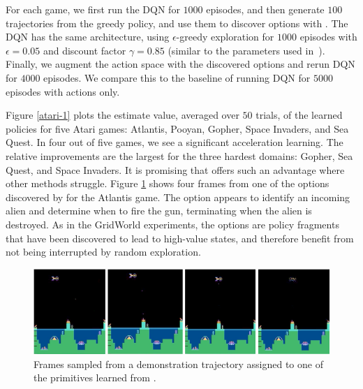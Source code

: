 For each game, we first run the DQN for $1000$ episodes, and then generate $100$ trajectories from the greedy policy, and use them to discover options with \alg.
The DQN has the same architecture, using $\epsilon$-greedy exploration for $1000$ episodes with $\epsilon=0.05$ and discount factor $\gamma=0.85$ (similar to the parameters used in~\citep{sygnowski2016learning}). 
Finally, we augment the action space with the discovered options and rerun DQN for $4000$ episodes. 
We compare this to the baseline of running DQN for $5000$ episodes with actions only.

Figure \ref{atari-1} plots the estimate value, averaged over $50$ trials, of the learned policies for five Atari games: Atlantis, Pooyan, Gopher, Space Invaders, and Sea Quest.
In four out of five games, we see a significant acceleration learning.
The relative improvements are the largest for the three hardest domains: Gopher, Sea Quest, and Space Invaders.
It is promising that \alg offers such an advantage where other methods struggle. 
Figure \ref{atari-3} shows four frames from one of the options discovered by \alg for the Atlantis game. %
The option appears to identify an incoming alien and determine when to fire the gun, terminating when the alien is destroyed.
As in the GridWorld experiments, the options are policy fragments that have been discovered to lead to high-value states, and therefore benefit from not being interrupted by random exploration.

\begin{figure}[ht!]
    \centering
    \includegraphics[width=\columnwidth]{ddco-experiments/atlantis-primitive.png}
    \caption{Frames sampled from a demonstration trajectory assigned to one of the primitives learned from \alg.  \label{atari-3}}
\end{figure}


